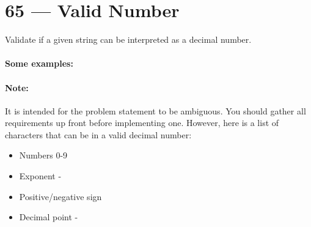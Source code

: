 \section{65 --- Valid Number}
Validate if a given string can be interpreted as a decimal number.

\paragraph{Some examples:}

\begin{flushleft}
















\end{flushleft}

\paragraph{Note:} 

It is intended for the problem statement to be ambiguous. You should gather all requirements up front before implementing one. However, here is a list of characters that can be in a valid decimal number:

\begin{itemize}
\item Numbers 0-9
\item Exponent - 
\item Positive/negative sign 
\item Decimal point - 
\end{itemize}